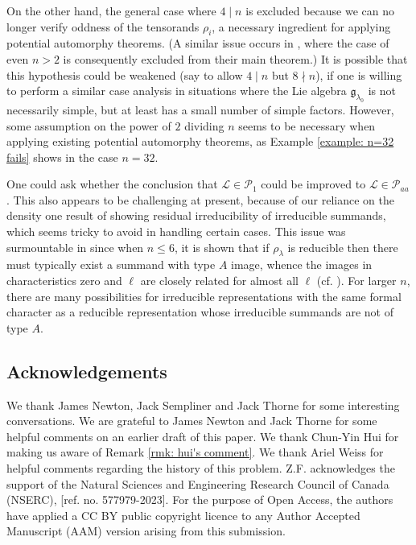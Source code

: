 \documentclass{amsart}
\theoremstyle{definition}
\numberwithin{equation}{section} %
\newcommand{\mc}[1]{\mathcal{#1}}
\newcommand{\mf}[1]{\mathfrak{#1}}
\begin{document}
On the other hand, the general case where \( 4\mid n \) is excluded because we can no longer verify oddness of the tensorands \( \rho_i \), a necessary ingredient for applying potential automorphy theorems.
(A similar issue occurs in \cite{CEG22}, where the case of even $n>2$ is consequently excluded from their main theorem.)
It is possible that this hypothesis could be weakened (say to allow \( 4\mid n \) but $8 \nmid n$), if one is willing to perform a similar case analysis in situations where the Lie algebra $\mf{g}_{\lambda_0}$ is not necessarily simple, but at least has a small number of simple factors.
However, some assumption on the power of $2$ dividing $n$ seems to be necessary when applying existing potential automorphy theorems, as Example \ref{example: n=32 fails} shows in the case $n=32$.

One could ask whether the conclusion that $\mathcal{L} \in \mc{P}_1$ could be improved to $\mc{L} \in \mc{P}_{aa}$.
This also appears to be challenging at present, because of our reliance on the density one result of \cite{BLGGT14} showing residual irreducibility of irreducible summands, which seems tricky to avoid in handling certain cases.
This issue was surmountable in \cite{Hui23} since when $n \leq 6$, it is shown that if $\rho_{\lambda}$ is reducible then there must typically exist a summand with type $A$ image, whence the images in characteristics zero and $\ell$ are closely related for almost all $\ell$ (cf. \cite[Theorem 3.12]{Hui23}).
For larger $n$, there are many possibilities for irreducible representations with the same formal character as a reducible representation whose irreducible summands are not of type $A$.

\subsection{Acknowledgements}

We thank James Newton, Jack Sempliner and Jack Thorne for some interesting conversations.
We are grateful to James Newton and Jack Thorne for some helpful comments on an earlier draft of this paper.
We thank Chun-Yin Hui for making us aware of Remark \ref{rmk: hui's comment}. 
We thank Ariel Weiss for helpful comments regarding the history of this problem.
Z.F. acknowledges the support of the Natural Sciences and Engineering Research Council of Canada (NSERC), [ref. no. 577979-2023].
For the purpose of Open Access, the authors have applied a CC BY public copyright licence to any Author Accepted Manuscript (AAM) version arising from this submission.
\end{document}
